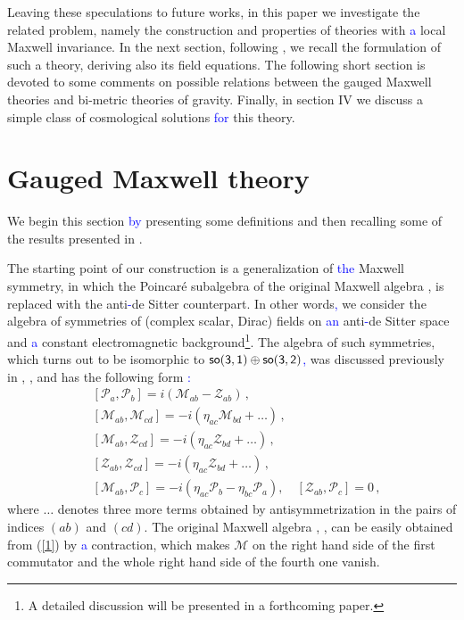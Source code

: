 \documentclass[prd,reprint,eqsecnum,nofootinbib]{revtex4-1}
\begin{document}
Leaving these speculations to future works, in this paper we
investigate the related problem, namely the construction and
properties of theories with \textcolor{blue}{a} local Maxwell invariance. In the next
section, following \cite{Durka:2011nf}, we recall the formulation of
such a theory, deriving also its field equations. The following
short section is devoted to some comments on possible relations
between the gauged Maxwell theories and bi-metric theories of
gravity. Finally, in section IV we discuss a simple class of
cosmological solutions \textcolor{blue}{for} this theory.

\section{Gauged Maxwell theory}

We begin this section \textcolor{blue}{by} presenting some definitions and then recalling
some of the results presented in \cite{Durka:2011nf}.

The starting point of our construction is a generalization of \textcolor{blue}{the}
Maxwell symmetry, in which the Poincar\'e subalgebra of the original
Maxwell algebra \cite{Bacry:1970ye}, \cite{Schrader:1972zd} is
replaced with the anti\textcolor{blue}{-}de Sitter counterpart. In other words\textcolor{blue}{,} we
consider the algebra of symmetries of (complex scalar, Dirac) fields
on \textcolor{blue}{an} anti\textcolor{blue}{-}de Sitter space and \textcolor{blue}{a} constant electromagnetic
background\footnote{A detailed discussion will be presented in a
forthcoming paper.}. The algebra of such symmetries, which turns out
to be isomorphic to $\sf{so}(3,1)\oplus\sf{so}(3,2)$\textcolor{blue}{,} was discussed
previously in \cite{Soroka:2006aj}, \cite{Bonanos:2010fw},
\cite{Lukierski:2010dy} and has the following form
\cite{Durka:2011nf}\textcolor{blue}{:}
\begin{align}
&[\mathcal{P}_{a},\mathcal{P}_{b}]=i(\mathcal{M}_{ab}-\mathcal{Z}_{ab})\,
,\nonumber\\
&[\mathcal{M}_{ab},\mathcal{M}_{cd}]=-i(\eta_{ac}\mathcal{M}_{bd}+\ldots)\, ,\nonumber\\
&[\mathcal{M}_{ab},\mathcal{Z}_{cd}]=-i(\eta_{ac}\mathcal{Z}_{bd}+\ldots)\,,\nonumber\\
&[\mathcal{Z}_{ab},\mathcal{Z}_{cd}]=-i(\eta_{ac}\mathcal{Z}_{bd}+\ldots)\, ,\nonumber\\
&[\mathcal{M}_{ab},\mathcal{P}_c]=-i(\eta_{ac}\mathcal{P}_{b}-\eta_{bc}\mathcal{P}_{a}),\quad
[\mathcal{Z}_{ab},\mathcal{P}_{c}]=0\,,\label{1}
\end{align}
where $\ldots$ denotes three more terms obtained by
antisymmetrization in the pairs of indices $(ab)$ and $(cd)$. The
original Maxwell algebra \cite{Soroka:2006aj},
\cite{Bonanos:2010fw}, \cite{Lukierski:2010dy} can be easily
obtained from (\ref{1}) by \textcolor{blue}{a} contraction, which makes $\mathcal{M}$ on
the right hand side of the first commutator and the whole right hand
side of the fourth one vanish.
\end{document}
